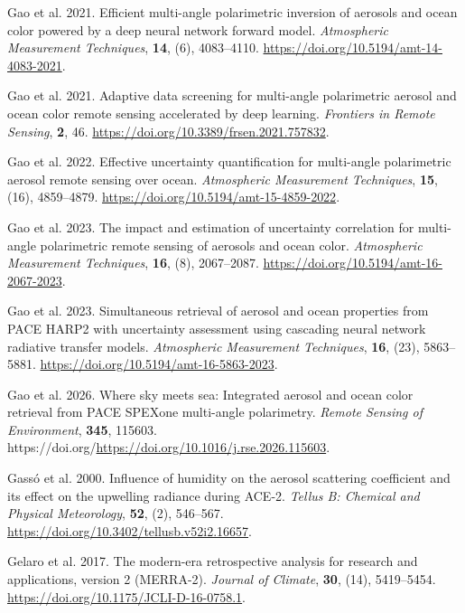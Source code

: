\documentclass[
  11pt,
  letterpaper,
]{scrreprt}
\newlength{\cslhangindent}
\newenvironment{CSLReferences}[2] %
 {\begin{list}{}{%
  \setlength{\itemindent}{0pt}
  \setlength{\leftmargin}{0pt}
  \setlength{\parsep}{0pt}
  \ifodd #1
   \setlength{\leftmargin}{\cslhangindent}
   \setlength{\itemindent}{-1\cslhangindent}
  \fi
  \setlength{\itemsep}{#2\baselineskip}}}
 {\end{list}}
\begin{document}
\begin{CSLReferences}{1}{1}
Gao et al. 2021. Efficient multi-angle polarimetric inversion of
aerosols and ocean color powered by a deep neural network forward model.
\emph{Atmospheric Measurement Techniques}, \textbf{14}, (6), 4083--4110.
\url{https://doi.org/10.5194/amt-14-4083-2021}.

Gao et al. 2021. Adaptive data screening for multi-angle polarimetric
aerosol and ocean color remote sensing accelerated by deep learning.
\emph{Frontiers in Remote Sensing}, \textbf{2}, 46.
\url{https://doi.org/10.3389/frsen.2021.757832}.

Gao et al. 2022. Effective uncertainty quantification for multi-angle
polarimetric aerosol remote sensing over ocean. \emph{Atmospheric
Measurement Techniques}, \textbf{15}, (16), 4859--4879.
\url{https://doi.org/10.5194/amt-15-4859-2022}.

Gao et al. 2023. The impact and estimation of uncertainty correlation
for multi-angle polarimetric remote sensing of aerosols and ocean color.
\emph{Atmospheric Measurement Techniques}, \textbf{16}, (8), 2067--2087.
\url{https://doi.org/10.5194/amt-16-2067-2023}.

Gao et al. 2023. Simultaneous retrieval of aerosol and ocean properties
from PACE HARP2 with uncertainty assessment using cascading neural
network radiative transfer models. \emph{Atmospheric Measurement
Techniques}, \textbf{16}, (23), 5863--5881.
\url{https://doi.org/10.5194/amt-16-5863-2023}.

Gao et al. 2026. Where sky meets sea: Integrated aerosol and ocean color
retrieval from PACE SPEXone multi-angle polarimetry. \emph{Remote
Sensing of Environment}, \textbf{345}, 115603.
https://doi.org/\url{https://doi.org/10.1016/j.rse.2026.115603}.

Gassó et al. 2000. Influence of humidity on the aerosol scattering
coefficient and its effect on the upwelling radiance during ACE-2.
\emph{Tellus B: Chemical and Physical Meteorology}, \textbf{52}, (2),
546--567. \url{https://doi.org/10.3402/tellusb.v52i2.16657}.

Gelaro et al. 2017. The modern-era retrospective analysis for research
and applications, version 2 (MERRA-2). \emph{Journal of Climate},
\textbf{30}, (14), 5419--5454.
\url{https://doi.org/10.1175/JCLI-D-16-0758.1}.


\end{CSLReferences}
\end{document}
